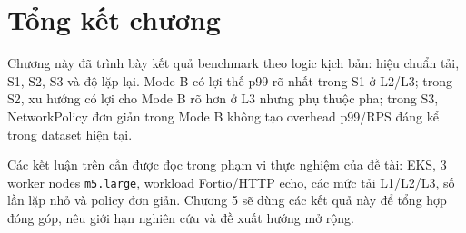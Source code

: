 \section{Tổng kết chương}

Chương này đã trình bày kết quả benchmark theo logic kịch bản: hiệu chuẩn tải, S1, S2, S3 và độ lặp lại. Mode B có lợi thế p99 rõ nhất trong S1 ở L2/L3; trong S2, xu hướng có lợi cho Mode B rõ hơn ở L3 nhưng phụ thuộc pha; trong S3, NetworkPolicy đơn giản trong Mode B không tạo overhead p99/RPS đáng kể trong dataset hiện tại.

Các kết luận trên cần được đọc trong phạm vi thực nghiệm của đề tài: EKS, 3 worker nodes \texttt{m5.large}, workload Fortio/HTTP echo, các mức tải L1/L2/L3, số lần lặp nhỏ và policy đơn giản. Chương 5 sẽ dùng các kết quả này để tổng hợp đóng góp, nêu giới hạn nghiên cứu và đề xuất hướng mở rộng.
